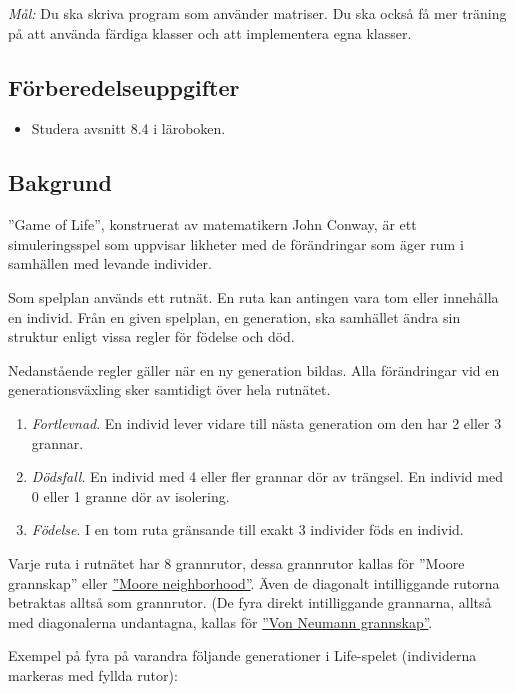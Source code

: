 \newpage
{}

\emph{Mål:} Du ska skriva program som använder matriser. Du ska också få mer träning
på att använda färdiga klasser och att implementera egna klasser.

\subsection*{Förberedelseuppgifter}
\begin{itemize} \tightlist
\item Studera avsnitt 8.4 i läroboken.
\end{itemize}

\subsection*{Bakgrund}
''Game of Life'', konstruerat av matematikern John Conway, är ett simuleringsspel som uppvisar likheter med de förändringar som äger rum i samhällen med levande individer.

Som spelplan används ett rutnät. En ruta kan antingen vara tom eller innehålla en individ. Från en given spelplan, en generation, ska samhället ändra sin struktur enligt vissa regler för födelse och död.

Nedanstående regler gäller när en ny generation bildas. Alla förändringar vid en generationsväxling
sker samtidigt över hela rutnätet.
\begin{enumerate} \tightlist
\item \textit{Fortlevnad}. En individ lever vidare till nästa generation om den har 2 eller 3 grannar.
\item \textit{Dödsfall}. En individ med 4 eller fler grannar dör av trängsel. En individ med 0 eller 1 granne dör av isolering.
\item \textit{Födelse}. I en tom ruta gränsande till exakt 3 individer föds en individ.
\end{enumerate}

Varje ruta i rutnätet har 8 grannrutor, dessa grannrutor kallas för ''Moore grannskap'' eller \href{https://en.wikipedia.org/wiki/Moore_neighborhood}{''Moore neighborhood''}. Även de diagonalt intilliggande rutorna betraktas alltså som grannrutor. (De fyra direkt intilliggande grannarna, alltså med diagonalerna undantagna, kallas för \href{https://en.wikipedia.org/wiki/Von_Neumann_neighborhood}{''Von Neumann grannskap''}.

Exempel på fyra på varandra följande generationer i Life-spelet (individerna markeras
med fyllda rutor):

